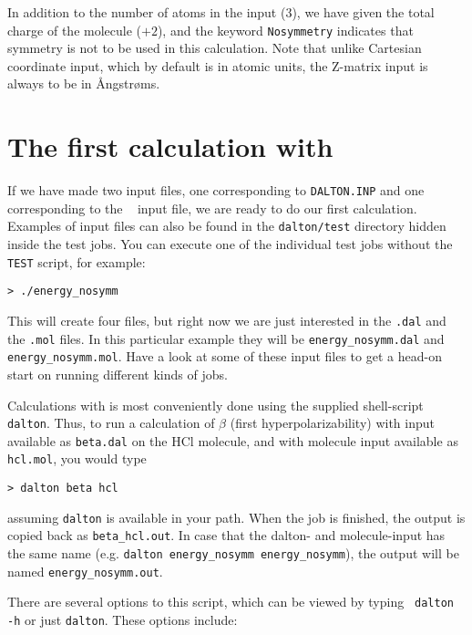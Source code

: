 In addition to the number of atoms in the input (3), we have given the
total charge of the
molecule ($+2$), and the keyword \verb|Nosymmetry| indicates that
symmetry is not to be used in this calculation. Note that
unlike Cartesian coordinate input, which by default is in atomic units, the
Z-matrix input is always to be in \AA ngstr\o ms.

\section{The first calculation with {\dalton}}\label{sec:firstcalc}

If we have made two input files, one corresponding to
\verb|DALTON.INP| and one corresponding to the \mol\
 input file, we
are ready to do our first calculation. Examples of input files can
also be found in the \verb|dalton/test| directory hidden inside the
test jobs. You can execute one of the individual test jobs
without the \verb|TEST| script, for example:
\begin{verbatim}
> ./energy_nosymm
\end{verbatim}
This will create four files, but right now we are just interested in
the \verb|.dal| and the \verb|.mol| files. In this particular example
they will be \verb|energy_nosymm.dal| and
\verb|energy_nosymm.mol|. Have a look at some of these input files to
get a head-on start on running different kinds of {\dalton} jobs.

Calculations with {\dalton} is most conveniently done using the
supplied shell-script \verb|dalton|. Thus,
to run a calculation of $\beta$ (first
hyperpolarizability) 
with input available as \verb|beta.dal| on the HCl molecule, and with
molecule input available as \verb|hcl.mol|, you would type

\begin{verbatim}
> dalton beta hcl
\end{verbatim}
assuming \verb|dalton| is available in your path. When the job is
finished, the output is copied back as \verb|beta_hcl.out|. In case that the
dalton- and molecule-input has the same name (e.g.
\verb|dalton energy_nosymm energy_nosymm|), the output will be named
\verb|energy_nosymm.out|.

There are several options to this script, which can be viewed by
typing \verb| dalton -h| or just \verb|dalton|. These options include:


